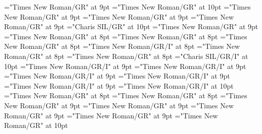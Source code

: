 \documentclass[gps1,twoside]{article}
\begin{document}
\font\spansensespanspandiventryletData="Times New Roman/GR" at 9pt
\font\spanenspansensespanspandiventryletData="Times New Roman/GR" at 10pt
\font\pronunciationsentryafterdiventryletData="Times New Roman/GR" at 9pt
\font\pronunciationspandiventryletData="Times New Roman/GR" at 9pt
\font\spanpronunciationspandiventryletData="Times New Roman/GR" at 9pt
\font\spanbzhfonipaspanpronunciationspandiventryletData="Charis SIL/GR" at 10pt
\font\examplessensesensesentryaftersensespanspandiventryletData="Times New Roman/GR" at 9pt
\font\examplespansensespanspandiventryletData="Times New Roman/GR" at 8pt
\font\examplebeforespansensespanspandiventryletData="Times New Roman/GR" at 8pt
\font\exampleafterspansensespanspandiventryletData="Times New Roman/GR" at 8pt
\font\exampleexamplespansensespanspandiventryletData="Times New Roman/GR/I" at 8pt
\font\examplebeforeexamplespansensespanspandiventryletData="Times New Roman/GR" at 8pt
\font\exampleafterexamplespansensespanspandiventryletData="Times New Roman/GR" at 8pt
\font\spanbzhexampleexamplespansensespanspandiventryletData="Charis SIL/GR/I" at 10pt
\font\spanexampleexampleexamplessensesensessensesensesentryexamplespansensespanspandiventryletData="Times New Roman/GR/I" at 9pt
\font\translationspanexampleexampleexamplessensesensessensesensesentryexamplespansensespanspandiventryletData="Times New Roman/GR/I" at 9pt
\font\translationafterspanexampleexampleexamplessensesensessensesensesentryexamplespansensespanspandiventryletData="Times New Roman/GR/I" at 9pt
\font\translationtranslationspanexampleexampleexamplessensesensessensesensesentryexamplespansensespanspandiventryletData="Times New Roman/GR/I" at 9pt
\font\translationaftertranslationspanexampleexampleexamplessensesensessensesensesentryexamplespansensespanspandiventryletData="Times New Roman/GR/I" at 9pt
\font\spanentranslationtranslationspanexampleexampleexamplessensesensessensesensesentryexamplespansensespanspandiventryletData="Times New Roman/GR/I" at 10pt
\font\exampleexampleexamplessensesensessensesensesentrybeforespansensespanspandiventryletData="Times New Roman/GR" at 8pt
\font\exampleexampleexamplessensesensessensesensessubentrysubentriesentrybeforeexamplespansensespanspandiventryletData="Times New Roman/GR" at 8pt
\font\semanticdomainssensesensesentrybeforesensespanspandiventryletData="Times New Roman/GR" at 9pt
\font\semanticdomainssensesensesentryaftersensespanspandiventryletData="Times New Roman/GR" at 9pt
\font\spanspansensespanspandiventryletData="Times New Roman/GR" at 9pt
\font\spanspanspansensespanspandiventryletData="Times New Roman/GR" at 9pt
\font\spanenspanspanspansensespanspandiventryletData="Times New Roman/GR" at 10pt
\end{document}
